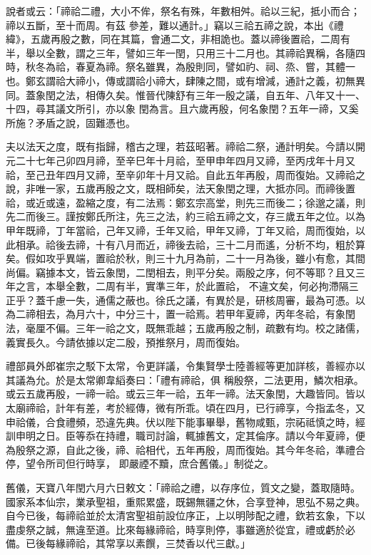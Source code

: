 \begin{pinyinscope}
 說者或云：「禘祫二禮，大小不侔，祭名有殊，年數相舛。祫以三紀，抵小而合；禘以五斷，至十而周。有茲
 參差，難以通計。」竊以三祫五禘之說，本出《禮緯》，五歲再殷之數，同在其篇，會通二文，非相詭也。蓋以禘後置祫，二周有半，舉以全數，謂之三年，譬如三年一閏，只用三十二月也。其禘祫異稱，各隨四時，秋冬為祫，春夏為禘。祭名雖異，為殷則同，譬如礿、祠、烝、嘗，其體一也。鄭玄謂祫大禘小，傳或謂祫小禘大，肆陳之間，或有增減，通計之義，初無異同。蓋象閏之法，相傳久矣。惟晉代陳舒有三年一殷之議，自五年、八年又十一、十四，尋其議文所引，亦以象
 閏為言。且六歲再殷，何名象閏？五年一禘，又奚所施？矛盾之說，固難憑也。



 夫以法天之度，既有指歸，稽古之理，若茲昭著。禘祫二祭，通計明矣。今請以開元二十七年己卯四月禘，至辛巳年十月祫，至甲申年四月又禘，至丙戌年十月又祫，至己丑年四月又禘，至辛卯年十月又祫。自此五年再殷，周而復始。又禘祫之說，非唯一家，五歲再殷之文，既相師矣，法天象閏之理，大抵亦同。而禘後置祫，或近或遠，盈縮之度，有二法焉：鄭玄宗高堂，則先三而後二；徐邈之議，則
 先二而後三。謹按鄭氏所注，先三之法，約三祫五禘之文，存三歲五年之位。以為甲年既禘，丁年當祫，己年又禘，壬年又祫，甲年又禘，丁年又祫，周而復始，以此相承。祫後去禘，十有八月而近，禘後去祫，三十二月而遙，分析不均，粗於算矣。假如攻乎異端，置祫於秋，則三十九月為前，二十一月為後，雖小有愈，其間尚偏。竊據本文，皆云象閏，二閏相去，則平分矣。兩殷之序，何不等耶？且又三年之言，本舉全數，二周有半，實準三年，於此置祫，
 不違文矣，何必拘滯隔三正乎？蓋千慮一失，通儒之蔽也。徐氏之議，有異於是，研核周審，最為可憑。以為二禘相去，為月六十，中分三十，置一祫焉。若甲年夏禘，丙年冬祫，有象閏法，毫厘不偏。三年一祫之文，既無乖越；五歲再殷之制，疏數有均。校之諸儒，義實長久。今請依據以定二殷，預推祭月，周而復始。



 禮部員外郎崔宗之駁下太常，令更詳議，令集賢學士陸善經等更加詳核，善經亦以其議為允。於是太常卿韋縚奏曰：「禮有禘祫，俱
 稱殷祭，二法更用，鱗次相承。或云五歲再殷，一禘一祫。或云三年一祫，五年一禘。法天象閏，大趣皆同。皆以太廟禘祫，計年有差，考於經傳，微有所乖。頃在四月，已行禘享，今指孟冬，又申祫儀，合食禮頻，恐違先典。伏以陛下能事畢舉，舊物咸甄，宗祏祗慎之時，經訓申明之日。臣等忝在持禮，職司討論，輒據舊文，定其倫序。請以今年夏禘，便為殷祭之源，自此之後，禘、祫相代，五年再殷，周而復始。其今年冬祫，準禮合停，望令所司但行時享，
 即嚴禋不黷，庶合舊儀。」制從之。



 舊儀，天寶八年閏六月六日敕文：「禘祫之禮，以存序位，質文之變，蓋取隨時。國家系本仙宗，業承聖祖，重熙累盛，既錫無疆之休，合享登神，思弘不易之典。自今已後，每禘祫並於太清宮聖祖前設位序正，上以明陟配之禮，欽若玄象，下以盡虔祭之誠，無違至道。比來每緣禘祫，時享則停，事雖適於從宜，禮或虧於必備。已後每緣禘祫，其常享以素饌，三焚香以代三獻。」




\end{pinyinscope}
